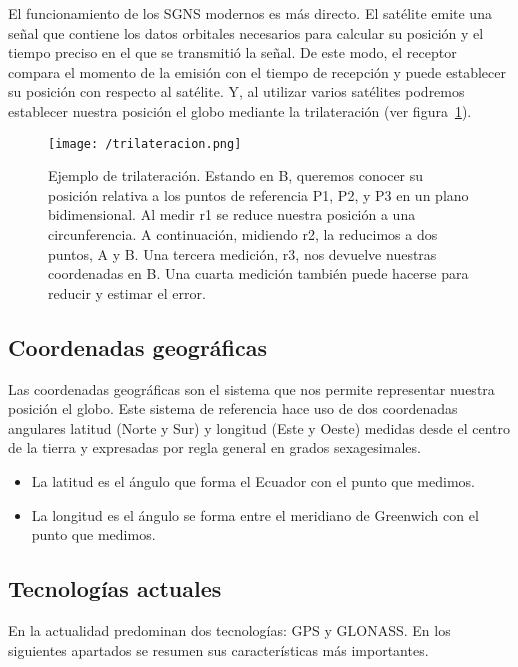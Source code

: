 El funcionamiento de los \acs{SGNS} modernos es más directo. El satélite emite una señal que
contiene los datos orbitales necesarios para calcular su posición y el tiempo preciso en el que se
transmitió la señal. De este modo, el receptor compara el momento de la emisión con el tiempo de
recepción y puede establecer su posición con respecto al satélite. Y, al utilizar varios satélites
podremos establecer nuestra posición el globo mediante la trilateración (ver
figura~\ref{fig:trilateracion}).

\begin{figure}[!h]
  \begin{center}
    \texttt{[image: /trilateracion.png]}
    \caption{Ejemplo de trilateración. Estando en B, queremos conocer su posición relativa a los
      puntos de referencia P1, P2, y P3 en un plano bidimensional. Al medir r1 se reduce nuestra
      posición a una circunferencia. A continuación, midiendo r2, la reducimos a dos puntos, A y
      B. Una tercera medición, r3, nos devuelve nuestras coordenadas en B. Una cuarta medición
      también puede hacerse para reducir y estimar el error.}
    \label{fig:trilateracion}
  \end{center}
\end{figure}

\subsection{Coordenadas geográficas}

Las coordenadas geográficas son el sistema que nos permite representar nuestra posición el
globo. Este sistema de referencia hace uso de dos coordenadas angulares latitud (Norte y Sur) y
longitud (Este y Oeste) medidas desde el centro de la tierra y expresadas por regla general en
grados sexagesimales.

\begin{itemize}
  \item La latitud es el ángulo que forma el Ecuador con el punto que medimos.
  \item La longitud es el ángulo se forma entre el meridiano de Greenwich con el punto que medimos.
\end{itemize}

\subsection{Tecnologías actuales}

En la actualidad predominan dos tecnologías: \acf{GPS} y \acf{GLONASS}. En los siguientes apartados
se resumen sus características más importantes.

